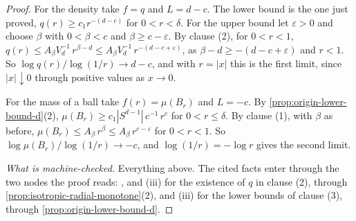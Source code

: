 \begin{proof}
For the density take $f = q$ and $L = d - c$. The lower bound is the one just proved,
$q(r) \ge c_1 r^{-(d-c)}$ for $0 < r < \delta$. For the upper bound let $\varepsilon > 0$ and
choose $\beta$ with $0 < \beta < c$ and $\beta \ge c - \varepsilon$. By clause (2), for
$0 < r < 1$,
$q(r) \le A_\beta V_d^{-1}\,r^{\beta-d} \le A_\beta V_d^{-1}\,r^{-(d-c+\varepsilon)}$, as
$\beta - d \ge -(d - c + \varepsilon)$ and $r < 1$. So $\log q(r)/\log(1/r) \to d - c$, and with
$r = |x|$ this is the first limit, since $|x| \downarrow 0$ through positive values as $x \to 0$.

For the mass of a ball take $f(r) = \mu(B_r)$ and $L = -c$. By
\ref{prop:origin-lower-bound-d}(2), $\mu(B_r) \ge c_1|S^{d-1}|\,c^{-1}\,r^{c}$ for
$0 < r \le \delta$. By clause (1), with $\beta$ as before,
$\mu(B_r) \le A_\beta\,r^{\beta} \le A_\beta\,r^{c-\varepsilon}$ for $0 < r < 1$. So
$\log\mu(B_r)/\log(1/r) \to -c$, and $\log(1/r) = -\log r$ gives the second limit.

\emph{What is machine-checked.} Everything above. The cited facts enter through the two nodes the
proof reads: ,  and (iii) for the existence of $q$ in clause (2),
through \ref{prop:isotropic-radial-monotone}(2), and (iii) for the lower bounds of
clause (3), through \ref{prop:origin-lower-bound-d}.
\end{proof}

